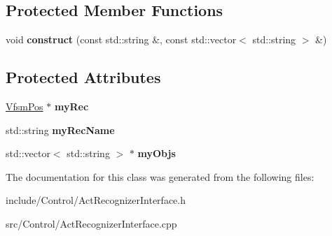 \subsection*{Protected Member Functions}
\begin{DoxyCompactItemize}
\item 
\hypertarget{classCartWheel_1_1ActRecognizerInterface_a729c27242fc2c686d3e40779b06317bb}{
void {\bfseries construct} (const std::string \&, const std::vector$<$ std::string $>$ \&)}
\label{classCartWheel_1_1ActRecognizerInterface_a729c27242fc2c686d3e40779b06317bb}

\end{DoxyCompactItemize}
\subsection*{Protected Attributes}
\begin{DoxyCompactItemize}
\item 
\hypertarget{classCartWheel_1_1ActRecognizerInterface_a7a0ef22b5d43105fd495955629b3a669}{
\hyperlink{classCartWheel_1_1VfsmPos}{VfsmPos} $\ast$ {\bfseries myRec}}
\label{classCartWheel_1_1ActRecognizerInterface_a7a0ef22b5d43105fd495955629b3a669}

\item 
\hypertarget{classCartWheel_1_1ActRecognizerInterface_ad694d3d4a5f952dfdffb83490af49fbc}{
std::string {\bfseries myRecName}}
\label{classCartWheel_1_1ActRecognizerInterface_ad694d3d4a5f952dfdffb83490af49fbc}

\item 
\hypertarget{classCartWheel_1_1ActRecognizerInterface_ad661ab15341da227193325ad025c9d85}{
std::vector$<$ std::string $>$ $\ast$ {\bfseries myObjs}}
\label{classCartWheel_1_1ActRecognizerInterface_ad661ab15341da227193325ad025c9d85}

\end{DoxyCompactItemize}


The documentation for this class was generated from the following files:\begin{DoxyCompactItemize}
\item 
include/Control/ActRecognizerInterface.h\item 
src/Control/ActRecognizerInterface.cpp\end{DoxyCompactItemize}
